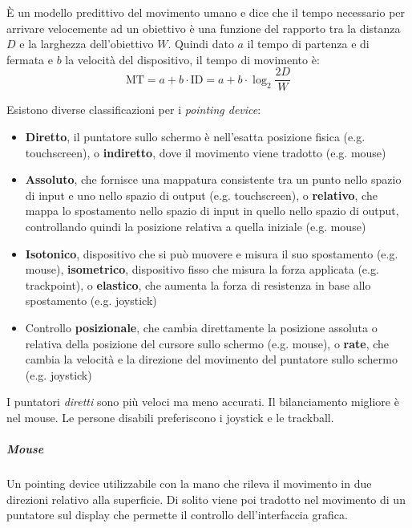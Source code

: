 \begin{definition}
	È un modello predittivo del movimento umano e dice che il tempo necessario per arrivare velocemente ad un obiettivo è una funzione del rapporto tra la distanza $D$ e la larghezza dell'obiettivo $W$. Quindi dato $a$ il tempo di partenza e di fermata e $b$ la velocità del dispositivo, il tempo di movimento è:
	\begin{equation}
		\text{MT} = a+b\cdot\text{ID}=a+b\cdot\log_2{\frac{2D}{W}}
	\end{equation}
\end{definition}

\noindent Esistono diverse classificazioni per i \textit{pointing device}:
\begin{itemize}
	\item \textbf{Diretto}, il puntatore sullo schermo è nell'esatta posizione fisica (e.g. touchscreen), o \textbf{indiretto}, dove il movimento viene tradotto (e.g. mouse)
	\item \textbf{Assoluto}, che fornisce una mappatura consistente tra un punto nello spazio di input e uno nello spazio di output (e.g. touchscreen), o \textbf{relativo}, che mappa lo spostamento nello spazio di input in quello nello spazio di output, controllando quindi la posizione relativa a quella iniziale (e.g. mouse)
	\item \textbf{Isotonico}, dispositivo che si può muovere e misura il suo spostamento (e.g. mouse), \textbf{isometrico}, dispositivo fisso che misura la forza applicata (e.g. trackpoint), o \textbf{elastico}, che aumenta la forza di resistenza in base allo spostamento (e.g. joystick)
	\item Controllo \textbf{posizionale}, che cambia direttamente la posizione assoluta o relativa della posizione del cursore sullo schermo (e.g. mouse), o \textbf{rate}, che cambia la velocità e la direzione del movimento del puntatore sullo schermo (e.g. joystick)
\end{itemize}

\begin{observation}
	I puntatori \textit{diretti} sono più veloci ma meno accurati. Il bilanciamento migliore è nel mouse. Le persone disabili preferiscono i joystick e le trackball.
\end{observation}

\subparagraph{Mouse} Un pointing device utilizzabile con la mano che rileva il movimento in due direzioni relativo alla superficie. Di solito viene poi tradotto nel movimento di un puntatore sul display che permette il controllo dell'interfaccia grafica.

